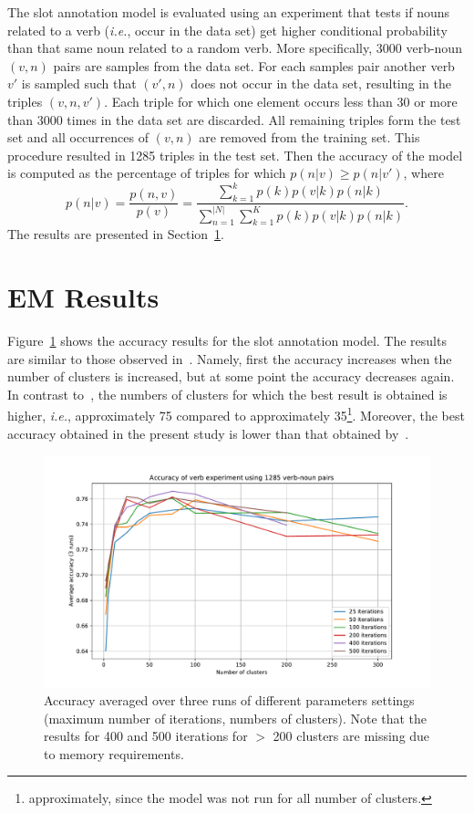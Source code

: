 \documentclass[11pt]{scrartcl}
\newcommand{\ie}{\textit{i.e.}}
\begin{document}
The slot annotation model is evaluated using an experiment that tests
if nouns related to a verb (\ie, occur in the data set) get higher
conditional probability than that same noun related to a random
verb. More specifically, 3000 verb-noun $(v, n)$ pairs are samples
from the data set. For each samples pair another verb $v'$ is sampled
such that $(v', n)$ does not occur in the data set, resulting in the
triples $(v, n , v')$. Each triple for which one element occurs less
than 30 or more than 3000 times in the data set are discarded. All
remaining triples form the test set and all occurrences of $(v, n)$
are removed from the training set. This procedure resulted in 1285
triples in the test set. Then the accuracy of the model is computed as
the percentage of triples for which $p(n|v) \ge p(n|v')$, where
\[
  p(n|v) = \frac{p(n, v)}{p(v)} =
  \frac{\sum_{k=1}^k p(k)p(v|k)p(n|k)}{\sum_{n=1}^{|N|}\sum_{k=1}^K p(k)p(v|k)p(n|k)}.
\]
The results are presented in Section~\ref{sec:results}.

\section{EM Results} %
\label{sec:results}
Figure~\ref{fig:accuracy} shows the accuracy results for the slot
annotation model. The results are similar to those observed
in~\cite{rooth1999inducing}. Namely, first the accuracy increases when
the number of clusters is increased, but at some point the accuracy
decreases again. In contrast to~\cite{rooth1999inducing}, the numbers
of clusters for which the best result is obtained is higher, \ie,
approximately 75 compared to approximately 35\footnote{approximately,
since the model was not run for all number of clusters.}. Moreover,
the best accuracy obtained in the present study is lower than that
obtained by~\cite{rooth1999inducing}. 

\begin{figure}
\includegraphics[width=\textwidth]{slotresults.pdf}
\caption{Accuracy averaged over three runs of different parameters
settings (maximum number of iterations, numbers of clusters). Note
that the results for 400 and 500 iterations for $>$ 200 clusters are
missing due to memory requirements.}
\label{fig:accuracy}
\end{figure}
\end{document}
